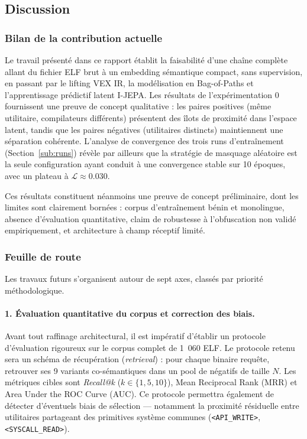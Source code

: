\subsection{Discussion}\label{sub:discussion}

\subsubsection{Bilan de la contribution actuelle}

Le travail présenté dans ce rapport établit la faisabilité d'une chaîne complète
allant du fichier ELF brut à un embedding sémantique compact, sans supervision, en
passant par le lifting VEX IR, la modélisation en Bag-of-Paths et l'apprentissage
prédictif latent I-JEPA. Les résultats de l'expérimentation 0 fournissent une preuve de
concept qualitative : les paires positives (même utilitaire, compilateurs différents)
présentent des îlots de proximité dans l'espace latent, tandis que les paires négatives
(utilitaires distincts) maintiennent une séparation cohérente. L'analyse de convergence
des trois runs d'entraînement (Section~\ref{sub:runs}) révèle par ailleurs que la
stratégie de masquage aléatoire est la seule configuration ayant conduit à une
convergence stable sur 10 époques, avec un plateau à $\mathcal{L} \approx 0.030$.

Ces résultats constituent néanmoins une preuve de concept préliminaire, dont les limites
sont clairement bornées : corpus d'entraînement bénin et monolingue, absence d'évaluation
quantitative, claim de robustesse à l'obfuscation non validé empiriquement, et
architecture à champ réceptif limité.

\subsubsection{Feuille de route}
\label{sub:todo}
Les travaux futurs s'organisent autour de sept axes, classés par priorité
méthodologique.

\paragraph{1. Évaluation quantitative du corpus et correction des biais.}
Avant tout raffinage architectural, il est impératif d'établir un protocole d'évaluation
rigoureux sur le corpus complet de 1~060 ELF. Le protocole retenu sera un schéma de
récupération (\textit{retrieval}) : pour chaque binaire requête, retrouver ses 9 variants
co-sémantiques dans un pool de négatifs de taille $N$. Les métriques cibles sont
\textit{Recall@k} ($k \in \{1, 5, 10\}$), Mean Reciprocal Rank (MRR) et Area Under the
ROC Curve (AUC). Ce protocole permettra également de détecter d'éventuels biais de
sélection — notamment la proximité résiduelle entre utilitaires partageant des primitives
système communes (\texttt{<API\_WRITE>}, \texttt{<SYSCALL\_READ>}).

